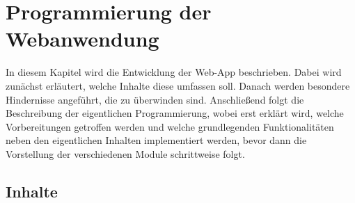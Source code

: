 %
\chapter{Programmierung der Webanwendung}
\label{sec:programming}

In diesem Kapitel wird die Entwicklung der Web-App beschrieben. Dabei wird zunächst erläutert, welche Inhalte diese umfassen soll. Danach werden besondere Hindernisse angeführt, die zu überwinden sind. Anschließend folgt die Beschreibung der eigentlichen Programmierung, wobei erst erklärt wird, welche Vorbereitungen getroffen werden und welche grundlegenden Funktionalitäten neben den eigentlichen Inhalten implementiert werden, bevor dann die Vorstellung der verschiedenen Module schrittweise folgt.

\section{Inhalte}
\label{sec:programming:contents}

